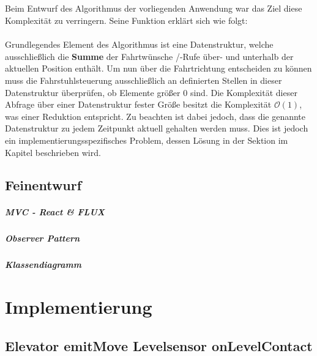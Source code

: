 \paragraph{}Beim Entwurf des Algorithmus der vorliegenden Anwendung war das Ziel diese Komplexität zu verringern. Seine Funktion erklärt sich wie folgt:\\ \\ Grundlegendes Element des Algorithmus ist eine Datenstruktur, welche ausschließlich die \textbf{Summe} der Fahrtwünsche /-Rufe über- und unterhalb der aktuellen Position enthält. Um nun über die Fahrtrichtung entscheiden zu können muss die Fahrstuhlsteuerung ausschließlich an definierten Stellen in dieser Datenstruktur überprüfen, ob Elemente größer 0 sind. Die Komplexität dieser Abfrage über einer Datenstruktur fester Größe besitzt die Komplexität $\mathcal{O}(1)$, was einer Reduktion entspricht. Zu beachten ist dabei jedoch, dass die genannte Datenstruktur zu jedem Zeitpunkt aktuell gehalten werden muss. Dies ist jedoch ein implementierungsspezifisches Problem, dessen Lösung in der Sektion \textit{} im Kapitel \textbf{} beschrieben wird.

\section{Feinentwurf}

\paragraph{MVC - React \& FLUX}
\paragraph{Observer Pattern}
\paragraph{Klassendiagramm}


\chapter{Implementierung}
\label{imp}

\section{Elevator emitMove Levelsensor onLevelContact}
\label{onLevelContact}

